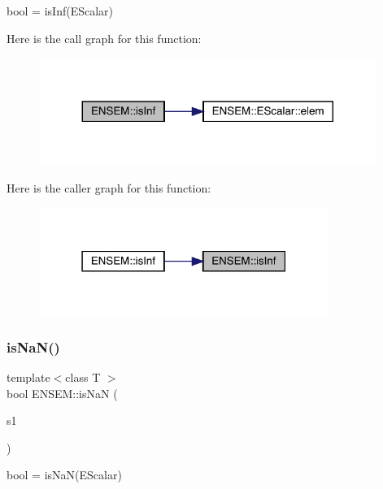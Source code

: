 bool = is\+Inf(\+E\+Scalar) 

Here is the call graph for this function\+:
\nopagebreak
\begin{figure}[H]
\begin{center}
\leavevmode
\includegraphics[width=311pt]{d4/dca/group__escalar_ga323a3743d3621a1c631ad3e52b85acba_cgraph}
\end{center}
\end{figure}
Here is the caller graph for this function\+:
\nopagebreak
\begin{figure}[H]
\begin{center}
\leavevmode
\includegraphics[width=267pt]{d4/dca/group__escalar_ga323a3743d3621a1c631ad3e52b85acba_icgraph}
\end{center}
\end{figure}
\mbox{\label{group__escalar_gada6bc3d89f9c0b0dc55465bdcbb35a78}} 
\subsubsection{\texorpdfstring{isNaN()}{isNaN()}}
{\footnotesize\ttfamily template$<$class T $>$ \\
bool E\+N\+S\+E\+M\+::is\+NaN (\begin{DoxyParamCaption}\item[{const \mbox{\hyperlink{classENSEM_1_1EScalar}{E\+Scalar}}$<$ T $>$ \&}]{s1 }\end{DoxyParamCaption})}



bool = is\+Na\+N(\+E\+Scalar) 

